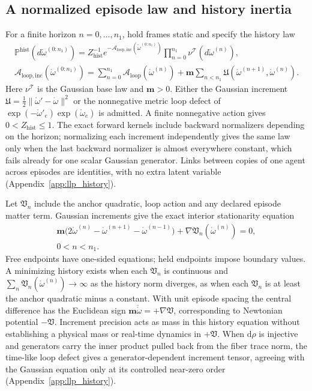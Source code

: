 \subsection{A normalized episode law and history inertia}
\label{sec:latent_link_history}
For a finite horizon $n=0,\ldots,n_1$, hold frames static and specify the history law
\begin{equation}
\begin{gathered}
\mathbb P^{\mathrm{hist}}(d\mathring\omega^{(0:n_1)})
=Z_{\mathrm{hist}}^{-1}e^{-\mathcal A_{\mathrm{loop,inc}}(\mathring\omega^{(0:n_1)})}
\prod_{n=0}^{n_1}\nu^{\mathcal T}(d\mathring\omega^{(n)}),\\
\mathcal A_{\mathrm{loop,inc}}(\mathring\omega^{(0:n_1)})
=\sum_{n=0}^{n_1}\mathcal A_{\mathrm{loop}}(\mathring\omega^{(n)})
+\mathbf m\sum_{n<n_1}\mathfrak U(\mathring\omega^{(n+1)},\mathring\omega^{(n)}).
\end{gathered}
\label{eq:latent_link_history_law}
\end{equation}
Here $\nu^{\mathcal T}$ is the Gaussian base law and $\mathbf m>0$. Either the Gaussian
increment $\mathfrak U=\tfrac12\|\mathring\omega'-\mathring\omega\|^2$ or the nonnegative
metric loop defect of $\exp(-\mathring\omega'_e)\exp(\mathring\omega_e)$ is admitted.
A finite nonnegative action gives $0<Z_{\mathrm{hist}}\leq1$. The exact forward kernels
include backward normalizers depending on the horizon; normalizing each increment
independently gives the same law only when the last backward normalizer is almost
everywhere constant, which fails already for one scalar Gaussian generator. Links between
copies of one agent across episodes are identities, with no extra latent variable
(Appendix~\ref{app:llp_history}).

Let $\mathfrak V_n$ include the anchor quadratic, loop action and any declared episode
matter term. Gaussian increments give the exact interior stationarity equation
\begin{equation}
\boxed{\begin{gathered}
\mathbf m\bigl(2\mathring\omega^{(n)}-\mathring\omega^{(n+1)}
-\mathring\omega^{(n-1)}\bigr)+\nabla\mathfrak V_n(\mathring\omega^{(n)})=0,\\
0<n<n_1.
\end{gathered}}
\label{eq:latent_link_history_inertia}
\end{equation}
Free endpoints have one-sided equations; held endpoints impose boundary values.
A minimizing history exists when each $\mathfrak V_n$ is continuous and
$\sum_n\mathfrak V_n(\mathring\omega^{(n)})\to\infty$ as the history norm diverges, as when
each $\mathfrak V_n$ is at least the anchor quadratic minus a constant. With unit episode
spacing the central difference has the Euclidean sign
$\mathbf m\ddot{\mathring\omega}=+\nabla\mathfrak V$, corresponding to Newtonian potential
$-\mathfrak V$. Increment precision acts as mass in this history equation without
establishing a physical mass or real-time dynamics in $+\mathfrak V$. When $\mathrm d\rho$
is injective and generators carry the inner product pulled back from the fiber trace norm,
the time-like loop defect gives a generator-dependent increment tensor, agreeing with the
Gaussian equation only at its controlled near-zero order (Appendix~\ref{app:llp_history}).

